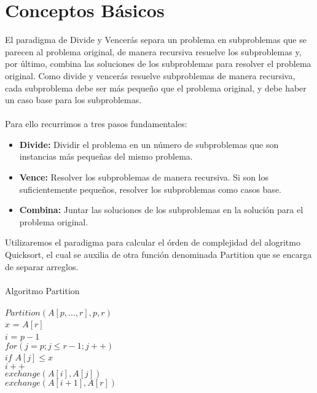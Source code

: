 \documentclass[12pt,twoside]{article}
\begin{document}
\section{Conceptos B\'asicos}
El paradigma de Divide y Vencer\'as separa un problema en subproblemas que se parecen al problema original, de manera recursiva resuelve los subproblemas y, por \'ultimo, combina las soluciones de los subproblemas para resolver el problema original.\newpage
Como divide y vencerás resuelve subproblemas de manera recursiva, cada subproblema debe ser m\'as pequeño que el problema original, y debe haber un caso base para los subproblemas.\\\\
Para ello recurrimos a tres pasos fundamentales:
\begin{itemize}
  \item {\bf Divide:} Dividir el problema en un n\'umero de subproblemas que son instancias m\'as pequeñas del mismo problema.
  \item {\bf Vence:} Resolver los subproblemas de manera recursiva. Si son los suficientemente peque\~{n}os, resolver los subproblemas como casos base.
  \item {\bf Combina:} Juntar las soluciones de los subproblemas en la soluci\'on para el problema original.
\end{itemize}
Utilizaremos el paradigma para calcular el \'orden de complejidad del alogritmo Quicksort, el cual se auxilia de otra funci\'on denominada Partition que se encarga de separar arreglos.\\\\
Algoritmo Partition\\\\
\hspace*{1cm}$Partition(A[p,...,r],p,r)$\\
\hspace*{2cm}$x$ = $A[r]$\\
\hspace*{2cm}$i$ = $p-1$\\
\hspace*{2cm}$for(j=p;j \leq r-1;j++)$\\
\hspace*{2.5cm}$if$ $A[j]\leq x$\\
\hspace*{3cm}$i++$\\
\hspace*{3cm}$exchange(A[i],A[j])$\\
\hspace*{2cm}$exchange(A[i+1],A[r])$\\
\end{document}

